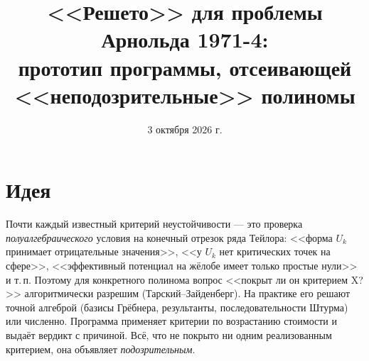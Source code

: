 \documentclass[11pt,a4paper]{article}
\title{<<Решето>> для проблемы Арнольда 1971-4:\\ прототип программы, отсеивающей <<неподозрительные>> полиномы}
\author{}
\date{3 октября 2026 г.}
\begin{document}
\maketitle
\vspace{-6mm}

\section{Идея}
Почти каждый известный критерий неустойчивости --- это проверка \emph{полуалгебраического} условия на
конечный отрезок ряда Тейлора: <<форма $U_k$ принимает отрицательные значения>>, <<у $U_k$ нет критических
точек на сфере>>, <<эффективный потенциал на жёлобе имеет только простые нули>> и т.\,п. Поэтому для
конкретного полинома вопрос <<покрыт ли он критерием X?>> алгоритмически разрешим (Тарский--Зайденберг).
На практике его решают точной алгеброй (базисы Грёбнера, результанты, последовательности Штурма) или
численно. Программа применяет критерии по возрастанию стоимости и выдаёт вердикт с причиной. Всё, что
не покрыто ни одним реализованным критерием, она объявляет \emph{подозрительным}.
\end{document}
